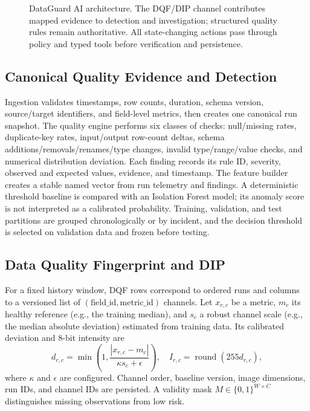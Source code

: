\documentclass[conference]{IEEEtran}
\begin{document}
\begin{figure}[t]
{}
\caption{DataGuard AI architecture. The DQF/DIP channel contributes mapped evidence to detection and investigation; structured quality rules remain authoritative. All state-changing actions pass through policy and typed tools before verification and persistence.}
\label{fig:architecture}
\end{figure}

\subsection{Canonical Quality Evidence and Detection}
Ingestion validates timestamps, row counts, duration, schema version, source/target identifiers, and field-level metrics, then creates one canonical run snapshot. The quality engine performs six classes of checks: null/missing rates, duplicate-key rates, input/output row-count deltas, schema additions/removals/renames/type changes, invalid type/range/value checks, and numerical distribution deviation. Each finding records its rule ID, severity, observed and expected values, evidence, and timestamp. The feature builder creates a stable named vector from run telemetry and findings. A deterministic threshold baseline is compared with an Isolation Forest model; its anomaly score is not interpreted as a calibrated probability. Training, validation, and test partitions are grouped chronologically or by incident, and the decision threshold is selected on validation data and frozen before testing.

\subsection{Data Quality Fingerprint and DIP}
For a fixed history window, DQF rows correspond to ordered runs and columns to a versioned list of $(\text{field\_id},\text{metric\_id})$ channels. Let $x_{r,c}$ be a metric, $m_c$ its healthy reference (e.g., the training median), and $s_c$ a robust channel scale (e.g., the median absolute deviation) estimated from training data. Its calibrated deviation and 8-bit intensity are
\begin{equation}
 d_{r,c}=\min\!\left(1,\frac{|x_{r,c}-m_c|}{\kappa s_c+\epsilon}\right),\quad I_{r,c}=\operatorname{round}(255d_{r,c}),
\end{equation}
where $\kappa$ and $\epsilon$ are configured. Channel order, baseline version, image dimensions, run IDs, and channel IDs are persisted. A validity mask $M\in\{0,1\}^{W\times C}$ distinguishes missing observations from low risk.
\end{document}
